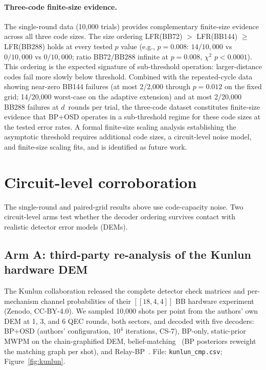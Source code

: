 \documentclass[11pt,a4paper]{article}
\begin{document}
\paragraph{Three-code finite-size evidence.}
The single-round data (10{,}000 trials) provides complementary
finite-size evidence across all three code sizes.
The size ordering LFR(BB72) $>$ LFR(BB144) $\ge$ LFR(BB288) holds
at every tested $p$ value
(e.g., $p=0.008$: $14/10{,}000$ vs $0/10{,}000$ vs $0/10{,}000$;
ratio BB72/BB288 infinite at $p=0.008$, $\chi^2$ $p<0.0001$).
This ordering is the expected signature of sub-threshold operation:
larger-distance codes fail more slowly below threshold.
Combined with the repeated-cycle data showing near-zero BB144 failures (at most 2/2{,}000
through $p=0.012$ on the fixed grid; 14/20{,}000 worst-case on the
adaptive extension) and at most 2/20{,}000 BB288 failures at $d$~rounds
per trial, the three-code dataset
constitutes finite-size evidence that BP+OSD operates in a sub-threshold
regime for these code sizes at the tested error rates.
A formal finite-size scaling analysis establishing the asymptotic threshold
requires additional code sizes, a circuit-level noise model, and
finite-size scaling fits, and is identified as future work.

\section{Circuit-level corroboration}
\label{sec:circuit}

The single-round and paired-grid results above use code-capacity noise.
Two circuit-level arms test whether the decoder ordering survives contact
with realistic detector error models (DEMs).

\subsection{Arm A: third-party re-analysis of the Kunlun hardware DEM}

The Kunlun collaboration released the complete detector check matrices and
per-mechanism channel probabilities of their $[[18,4,4]]$ BB hardware
experiment~\cite{Wang2026kunlun} (Zenodo, CC-BY-4.0). We sampled
10{,}000 shots per point from the authors' own DEM at 1, 3, and 6 QEC
rounds, both sectors, and decoded with five decoders: BP+OSD (authors'
configuration, $10^4$ iterations, CS-7), BP-only, static-prior MWPM on the
chain-graphified DEM, belief-matching~\cite{Higgott2023belief} (BP
posteriors reweight the matching graph per shot), and
Relay-BP~\cite{Muller2025relay}. File: \texttt{kunlun\_cmp.csv};
Figure~\ref{fig:kunlun}.
\end{document}
